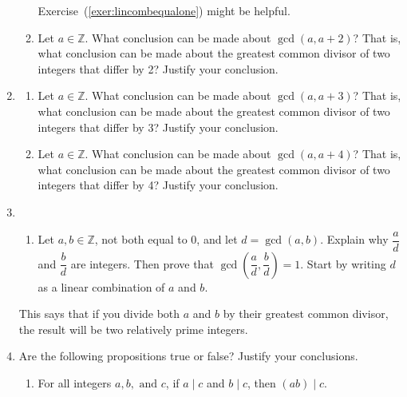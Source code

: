 \begin{enumerate}
\begin{enumerate}
\hint  Exercise~(\ref{exer:lincombequalone}) might be helpful.

  \item Let  $a \in \mathbb{Z}$.  What conclusion can be made about  
$\gcd( {a, a + 2} )$?  That is, what conclusion can be made about the greatest common divisor of two integers that differ by 2? Justify your conclusion.
\end{enumerate}

\item \label{exer:sec82-moregcd}
\begin{enumerate}
\item Let  $a \in \mathbb{Z}$.  What conclusion can be made about  
$\gcd( {a, a + 3} )$?  That is, what conclusion can be made about the greatest common divisor of two integers that differ by 3? Justify your conclusion.

\item Let  $a \in \mathbb{Z}$.  What conclusion can be made about  
$\gcd( {a, a + 4} )$?  That is, what conclusion can be made about the greatest common divisor of two integers that differ by 4? Justify your conclusion.
\end{enumerate}

\item \begin{enumerate} \label{exer:dividebygcd}
\yitem Let $a = 16$ and $b = 28$.  Determine the value of $d = \gcd( a, b )$, and then determine the value of $\gcd \!\left( {\dfrac{a}{d}, \dfrac{b}{d}} \right )$.
\label{exer:gcd-divbyd}

\yitem Repeat Exercise~(\ref{exer:gcd-divbyd}) with $a = 10$ and $b = 45$.

\item Let $a, b \in \mathbb{Z}$, not both equal to 0, and let $d = \gcd( a, b )$.
Explain why $\dfrac{a}{d}$ and $\dfrac{b}{d}$ are integers.  Then prove that 
$\gcd \!\left( {\dfrac{a}{d}, \dfrac{b}{d}} \right ) = 1$.  \hint  Start by writing $d$ as a linear combination of $a$ and $b$.

\end{enumerate}

This says that if you divide both  $a$  and  $b$  by their greatest common divisor, the result will be two relatively prime integers.

\item Are the following propositions true or false? Justify your conclusions.
\label{exer:sec82-truefalse}

\begin{enumerate}
  \item For all integers $a, b, \text{ and }c$, if $a \mid c$ and  $b \mid c$, then  
        $\left( {ab} \right)  \mid  c$.


\end{enumerate}
\end{enumerate}
